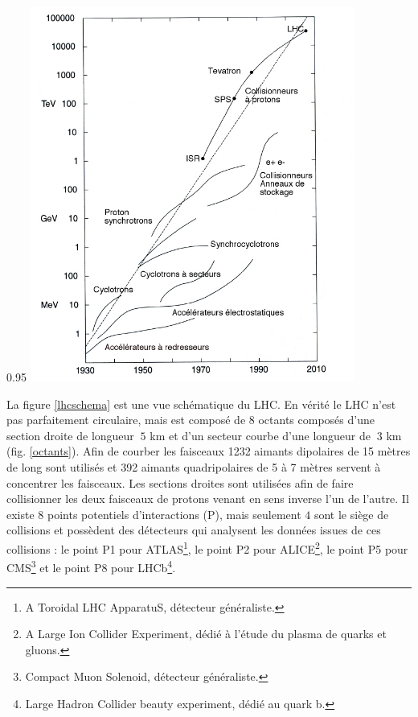 \begin{minipagewithmarginpars}[h]{0.95\textwidth}
	\centering
	\includegraphics[width=0.8\textwidth]{LHC/Livingstone.jpg}
	\label{livingston}	
\end{minipagewithmarginpars}

La figure \ref{lhcschema} est une vue schématique du LHC. En vérité le LHC n'est pas parfaitement circulaire, mais est composé de $8$ octants composés d'une section droite de longueur $~5$ km et d'un secteur courbe d'une longueur de $~3$ km (fig. \ref{octants}). Afin de courber les faisceaux 1232 aimants dipolaires de 15 mètres de long sont utilisés et 392 aimants quadripolaires de 5 à 7 mètres servent à concentrer les faisceaux. Les sections droites sont utilisées afin de faire collisionner les deux faisceaux de protons venant en sens inverse l'un de l'autre. Il existe $8$ points potentiels d'interactions (P), mais seulement $4$ sont le siège de collisions et possèdent des détecteurs qui analysent les données issues de ces collisions : le point P1 pour ATLAS\footnote{A Toroidal LHC ApparatuS, détecteur généraliste.}, le point P2 pour ALICE\footnote{A Large Ion Collider Experiment, dédié à l'étude du plasma de quarks et gluons.}, le point P5 pour CMS\footnote{Compact Muon Solenoid, détecteur généraliste.} et le point P8 pour LHCb\footnote{Large Hadron Collider beauty experiment, dédié au quark b.}.

